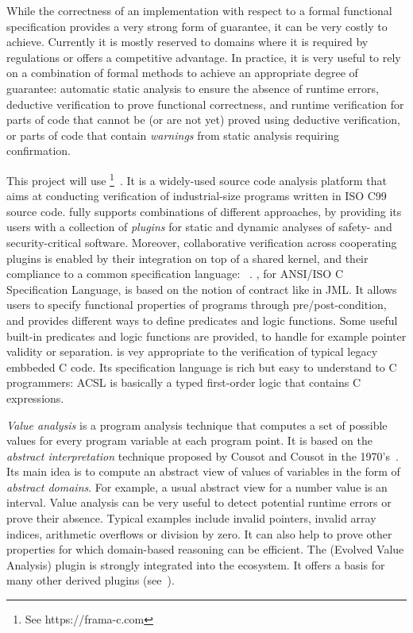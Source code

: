 While the correctness of an implementation with respect to a formal functional specification provides a very strong form of guarantee, it can be very costly to achieve.
Currently it is mostly reserved to domains where it is required by regulations or offers a competitive advantage.
In practice, it is very useful to rely on a combination of formal methods to achieve an appropriate degree of guarantee:
automatic static analysis to ensure the absence of runtime errors,
deductive verification to prove functional correctness,
and runtime verification for parts of code that cannot be (or are not yet) proved using deductive verification,
or parts of code that contain \emph{warnings} from static analysis requiring confirmation.

This project will use \framac{}\footnote{See   https://frama-c.com}~\cite{KKP2015:FAC}.
It is a widely-used source code analysis platform that aims at conducting verification of industrial-size programs written in ISO C99 source code.
\framac{} fully supports combinations of different approaches, by providing its users with a collection of \emph{plugins} for static and dynamic analyses of safety- and security-critical software.
Moreover, collaborative verification across cooperating plugins is enabled by their integration on top of a shared kernel, and their compliance to a common specification language: \acsl~\cite{ACSL}.
\acsl, for ANSI/ISO C Specification Language, is based on the notion of contract like in JML.
It allows users to specify functional properties of programs through pre/post-condition, and provides different ways to define predicates and logic functions.
Some useful built-in predicates and logic functions are provided, to handle for example pointer validity or separation.
\framac is vey appropriate to the verification of typical legacy embbeded C code.
Its specification language is rich but easy to understand to C programmers: ACSL is basically a typed first-order logic that contains C expressions.

\emph{Value analysis} is a program analysis technique that computes a set of possible values for every program variable at each program point.
It is based on the \emph{abstract interpretation} technique proposed by Cousot and Cousot in the 1970's~\cite{cousot77}.
Its main idea is to compute an abstract view of values of variables in the form of \emph{abstract domains}.
For example, a usual abstract view for a number value is an interval.
Value analysis can be very useful to detect potential runtime errors or prove their absence.
Typical examples include invalid pointers, invalid array indices, arithmetic overflows or division by zero.
It can also help to prove other properties for which domain-based reasoning can be efficient.
The \Eva (Evolved Value Analysis) plugin is strongly integrated into the \framac ecosystem.
It offers a basis for many other derived plugins (see~\cite{KKP2015:FAC}).

